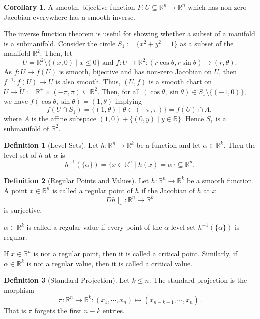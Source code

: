 \documentclass[]{article}
\theoremstyle{definition}
\newtheorem{corollary}{Corollary}[theorem]
\theoremstyle{definition}
\newtheorem{definition}{Definition}[section]
\begin{document}
\begin{corollary}
  A smooth, bijective function \(F : U \subseteq \mathbb{R}^n \to \mathbb{R}^n\) 
  which has non-zero Jacobian everywhere has a smooth inverse.
\end{corollary}

The inverse function theorem is useful for showing whether a subset of a manifold 
is a submanifold. Consider the circle \(S_1 := \{x^2 + y^2 = 1\}\) as a subset 
of the manifold \(\mathbb{R}^2\). Then, let 
\[U = \mathbb{R}^2 \setminus \{(x, 0) \mid x \le 0\} \text{ and } 
  f : U \to \mathbb{R}^2 : (r\cos \theta, r\sin \theta) \mapsto (r, \theta).\]
As \(f : U \to f(U)\) is smooth, bijective and has non-zero Jacobian on \(U\), 
then \(f^{-1} : f(U) \to U\) is also smooth. Thus, \((U, f)\) is a smooth chart 
on \(U \to \tilde U := \mathbb{R}^+ \times (-\pi, \pi) \subseteq \mathbb{R}^2\). 
Then, for all \((\cos \theta, \sin \theta) \in S_1 \setminus \{(-1, 0)\}\), 
we have \(f(\cos \theta, \sin \theta) = (1, \theta)\) implying 
\[f(U \cap S_1) = \{(1, \theta) \mid \theta \in (-\pi, \pi)\} = 
  f(U) \cap A,\]
where \(A\) is the affine subspace \((1, 0) + \{(0, y) \mid y \in \mathbb{R}\}\).
Hence \(S_1\) is a submanifold of \(\mathbb{R}^2\).

\begin{definition}[Level Sets]
  Let \(h : \mathbb{R}^n \to \mathbb{R}^k\) be a function and let 
  \(\alpha \in \mathbb{R}^k\). Then the level set of \(h\) at \(\alpha\) is 
  \[h^{-1}(\{\alpha\}) = 
    \{x \in \mathbb{R}^n \mid h(x)= \alpha\} \subseteq \mathbb{R}^n.\]
\end{definition}

\begin{definition}[Regular Points and Values]
  Let \(h : \mathbb{R}^n \to \mathbb{R}^k\) be a smooth function. A point 
  \(x \in \mathbb{R}^n\) is called a regular point of \(h\) if the Jacobian of 
  \(h\) at \(x\) 
  \[Dh\mid_x : \mathbb{R}^n \to \mathbb{R}^k\]
  is surjective.

  \(\alpha \in \mathbb{R}^k\) is called a regular value if every point of 
  the \(\alpha\)-level set \(h^{-1}(\{\alpha\})\) is regular.

  If \(x \in \mathbb{R}^n\) is not a regular point, then it is called a critical 
  point. Similarly, if \(\alpha \in \mathbb{R}^k\) is not a regular value, 
  then it is called a critical value. 
\end{definition}

\begin{definition}[Standard Projection]
  Let \(k \le n\). The standard projection is the morphism 
  \[\pi : \mathbb{R}^n \to \mathbb{R}^k : (x_1, \cdots, x_n) \mapsto 
    (x_{n-k+1}, \cdots, x_n).\]
  That is \(\pi\) forgets the first \(n-k\) entries.
\end{definition}
\end{document}
